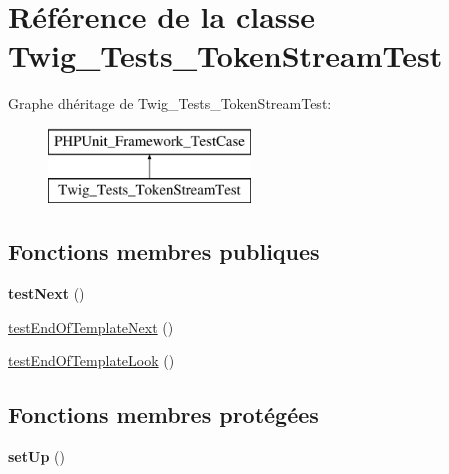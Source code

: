 \hypertarget{class_twig___tests___token_stream_test}{}\section{Référence de la classe Twig\+\_\+\+Tests\+\_\+\+Token\+Stream\+Test}
\label{class_twig___tests___token_stream_test}
Graphe d\textquotesingle{}héritage de Twig\+\_\+\+Tests\+\_\+\+Token\+Stream\+Test\+:\begin{figure}[H]
\begin{center}
\leavevmode
\includegraphics[height=2.000000cm]{class_twig___tests___token_stream_test}
\end{center}
\end{figure}
\subsection*{Fonctions membres publiques}
\begin{DoxyCompactItemize}
\item 
{\bfseries test\+Next} ()\hypertarget{class_twig___tests___token_stream_test_ad044680f6bb82f50a6ea0f42c8de6b79}{}\label{class_twig___tests___token_stream_test_ad044680f6bb82f50a6ea0f42c8de6b79}

\item 
\hyperlink{class_twig___tests___token_stream_test_a3086a64b2730baffaac5694e8c5f8f95}{test\+End\+Of\+Template\+Next} ()
\item 
\hyperlink{class_twig___tests___token_stream_test_a950beea887ba2c3a77973cbc40415244}{test\+End\+Of\+Template\+Look} ()
\end{DoxyCompactItemize}
\subsection*{Fonctions membres protégées}
\begin{DoxyCompactItemize}
\item 
{\bfseries set\+Up} ()\hypertarget{class_twig___tests___token_stream_test_a0bc688732d2b3b162ffebaf7812e78da}{}\label{class_twig___tests___token_stream_test_a0bc688732d2b3b162ffebaf7812e78da}

\end{DoxyCompactItemize}
